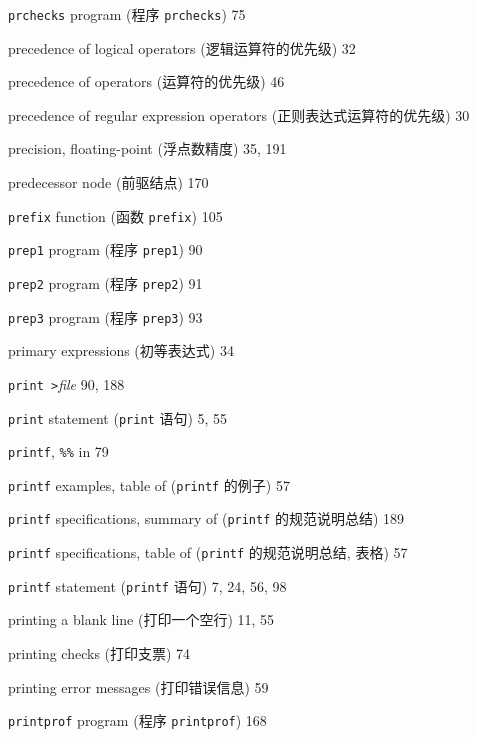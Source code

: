 \begin{multicols}{2}
\hangindent=2pc  \verb'prchecks' program (程序 \verb'prchecks') 75

\hangindent=2pc  precedence of logical operators
(逻辑运算符的优先级) 32

\hangindent=2pc  precedence of operators (运算符的优先级) 46

\hangindent=2pc  precedence of regular expression operators
(正则表达式运算符的优先级) 30

\hangindent=2pc  precision, floating-point (浮点数精度) 35, 191

\hangindent=2pc  predecessor node (前驱结点) 170

\hangindent=2pc  \verb'prefix' function (函数 \verb'prefix') 105

\hangindent=2pc  \verb'prep1' program (程序 \verb'prep1') 90

\hangindent=2pc  \verb'prep2' program (程序 \verb'prep2') 91

\hangindent=2pc  \verb'prep3' program (程序 \verb'prep3') 93

\hangindent=2pc  primary expressions (初等表达式) 34

\hangindent=2pc  \verb'print >'\textit{file} 90, 188

\hangindent=2pc  \verb'print' statement (\verb'print' 语句) 5, 55

\hangindent=2pc  \verb'printf', \verb'%%' in 79

\hangindent=2pc  \verb'printf' examples, table of
(\verb'printf' 的例子) 57

\hangindent=2pc  \verb'printf' specifications, summary of
(\verb'printf' 的规范说明总结) 189


\hangindent=2pc  \verb'printf' specifications, table of
(\verb'printf' 的规范说明总结, 表格) 57


\hangindent=2pc  \verb'printf' statement (\verb'printf' 语句)
7, 24, 56, 98

\hangindent=2pc  printing a blank line (打印一个空行) 11, 55

\hangindent=2pc  printing checks (打印支票) 74

\hangindent=2pc  printing error messages (打印错误信息) 59

\hangindent=2pc  \verb'printprof' program (程序
\verb'printprof') 168


\end{multicols}
